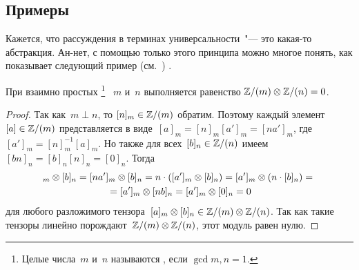 \subsection{Примеры}

Кажется, что рассуждения в терминах универсальности~"--- это какая-то абстракция. Ан-нет, с помощью только этого принципа можно многое понять, как показывает следующий пример
(см.~\cite[10]{gorodentsev03})%
.

\begin{example}
	При взаимно простых%
	\footnote{%
		Целые числа~$m$ и~$n$ называются , если $\gcd{m, n} = 1$.%
	}%
	~$m$ и~$n$ выполняется равенство
	$\mathbb{Z}/(m) \otimes \mathbb{Z}/(n) = 0$.
\end{example}
\begin{proof}
	Так как~$m \perp n$, то $[n]_m \in \mathbb{Z}/(m)$ обратим. Поэтому каждый элемент~$[a] \in \mathbb{Z}/(m)$ представляется в виде~$[a]_m = [n]_m[a']_m = [na']_m$, где $[a']_m = [n]_m^{-1}[a]_m$. Но также для всех~$[b]_n \in \mathbb{Z}/(n)$ имеем~$[bn]_n = [b]_n [n]_n = [0]_n$. Тогда
	\begin{multline*}
		[a]_m \otimes [b]_n
		=
		[na']_m \otimes [b]_n
		=
		n \cdot ([a']_m \otimes [b]_n)
		=
		[a']_m \otimes (n \cdot [b]_n)
		\nline{=}
		[a']_m \otimes [nb]_n
		=
		[a']_m \otimes [0]_n
		=
		0
	\end{multline*}
	для любого разложимого тензора~$[a]_m \otimes [b]_n \in \mathbb{Z}/(m) \otimes \mathbb{Z}/(n)$. Так как такие тензоры линейно порождают~$\mathbb{Z}/(m) \otimes \mathbb{Z}/(n)$, этот модуль равен нулю.
\end{proof}

